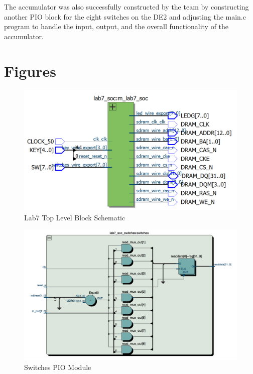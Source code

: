 \documentclass[journal, twocolumn, final,11pt,letterpaper]{IEEEtran}
\begin{document}
The accumulator was also successfully constructed by the team by constructing another PIO block for the eight switches on the DE2 and adjusting the main.c program to handle the input, output, and the overall functionality of the accumulator.\\  


\clearpage
\onecolumn
\section{Figures}

\begin{figure} [H]
	\centering
	\includegraphics[scale=0.4]{top-top-circuit.png}
	\caption{Lab7 Top Level Block Schematic\label{fig:top-level}}
\end{figure}

\begin{figure} [H]
	\centering
	\includegraphics[scale=0.4]{switches_pio_module.png}
	\caption{Switches PIO Module\label{fig:switch-pio}}
\end{figure}
\end{document}
